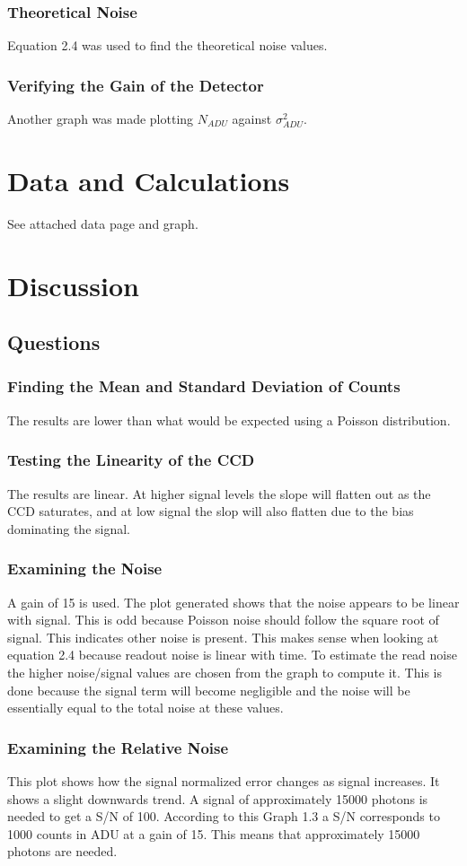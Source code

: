 \documentclass{article}
\begin{document}
\subsubsection{Theoretical Noise}
Equation 2.4 was used to find the theoretical noise values.
\subsubsection{Verifying the Gain of the Detector}
Another graph was made plotting $N_{ADU}$ against $\sigma_{ADU}^2$.
\section{Data and Calculations}
See attached data page and graph.
\section{Discussion}
\subsection{Questions}
\subsubsection{Finding the Mean and Standard Deviation of Counts}
The results are lower than what would be expected using a Poisson distribution.
\subsubsection{Testing the Linearity of the CCD}
The results are linear. At higher signal levels the slope will flatten out as the CCD saturates, and at low signal the slop will also flatten due to the bias dominating the signal.
\subsubsection{Examining the Noise}
A gain of 15 is used. The plot generated shows that the noise appears to be linear with signal. This is odd because Poisson noise should follow the square root of signal. This indicates other noise is present. This makes sense when looking at equation 2.4 because readout noise is linear with time. To estimate the read noise the higher noise/signal values are chosen from the graph to compute it. This is done because the signal term will become negligible and the noise will be essentially equal to the total noise at these values. 
\subsubsection{Examining the Relative Noise}
This plot shows how the signal normalized error changes as signal increases. It shows a slight downwards trend. A signal of approximately 15000 photons is needed to get a S/N of 100. According to this Graph 1.3 a S/N corresponds to 1000 counts in ADU at a gain of 15. This means that approximately 15000 photons are needed.
\end{document}
